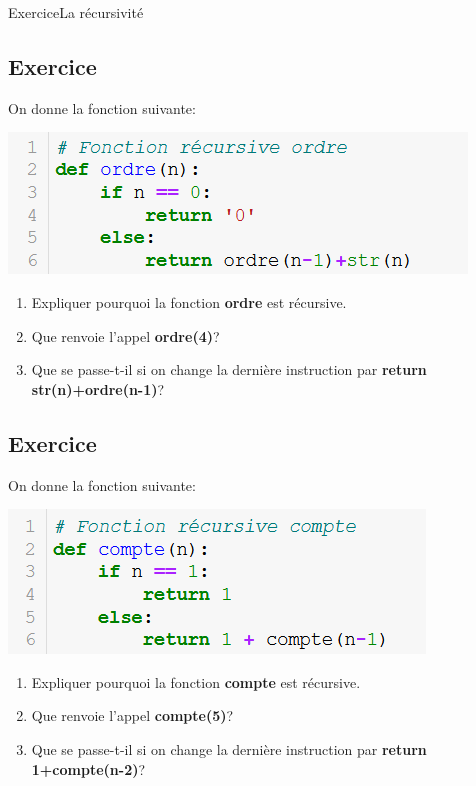 \documentclass[11pt,a4paper]{article}
\newcounter{numexo}
\begin{document}
\begin{NSI}
{Exercice}{La récursivité}
\end{NSI}

\addtocounter{numexo}{1}
\subsection*{\Large Exercice \thenumexo}
On donne la fonction suivante:
\begin{center}
\includegraphics[scale=0.8]{img/ordre.png}
\end{center}
\begin{enumerate}
\item Expliquer pourquoi la fonction \textbf{ordre} est récursive.
\item Que renvoie l'appel \textbf{ordre(4)}?
\item Que se passe-t-il si on change la dernière instruction par \textbf{return str(n)+ordre(n-1)}?
\end{enumerate}

\addtocounter{numexo}{1}
\subsection*{\Large Exercice \thenumexo}
On donne la fonction suivante:
\begin{center}
\includegraphics[scale=0.8]{img/compte.png}
\end{center}
\begin{enumerate}
\item Expliquer pourquoi la fonction \textbf{compte} est récursive.
\item Que renvoie l'appel \textbf{compte(5)}?
\item Que se passe-t-il si on change la dernière instruction par \textbf{return 1+compte(n-2)}?
\end{enumerate}
\end{document}
